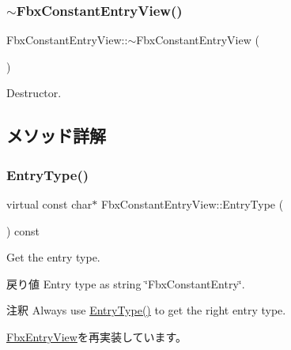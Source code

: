 \subsubsection{\texorpdfstring{$\sim$\+Fbx\+Constant\+Entry\+View()}{~FbxConstantEntryView()}}
{\footnotesize\ttfamily Fbx\+Constant\+Entry\+View\+::$\sim$\+Fbx\+Constant\+Entry\+View (\begin{DoxyParamCaption}{ }\end{DoxyParamCaption})}



Destructor. 



\subsection{メソッド詳解}
\mbox{\label{class_fbx_constant_entry_view_a7ea7fc9df5e1316854d18ffcc797e564}} 
\subsubsection{\texorpdfstring{Entry\+Type()}{EntryType()}}
{\footnotesize\ttfamily virtual const char$\ast$ Fbx\+Constant\+Entry\+View\+::\+Entry\+Type (\begin{DoxyParamCaption}{ }\end{DoxyParamCaption}) const\hspace{0.3cm}{\ttfamily [virtual]}}

Get the entry type. \begin{DoxyReturn}{戻り値}
Entry type as string \char`\"{}\+Fbx\+Constant\+Entry\char`\"{}. 
\end{DoxyReturn}
\begin{DoxyRemark}{注釈}
Always use \hyperlink{class_fbx_constant_entry_view_a7ea7fc9df5e1316854d18ffcc797e564}{Entry\+Type()} to get the right entry type. 
\end{DoxyRemark}


\hyperlink{class_fbx_entry_view_a83ee50482b441ba8b0e6d7c2dba5432f}{Fbx\+Entry\+View}を再実装しています。

\mbox{\label{class_fbx_constant_entry_view_a5e61786ae363b4281f5515e225722700}} 
